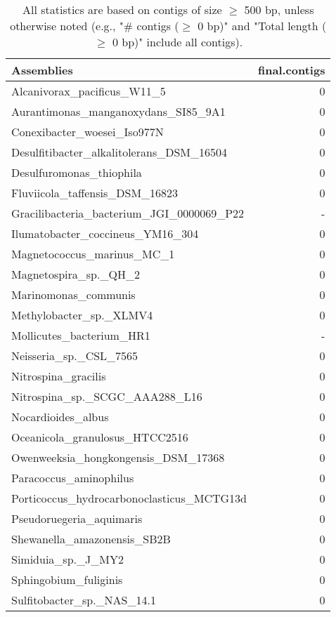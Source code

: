 \documentclass[12pt,a4paper]{article}
\begin{document}
\begin{table}[ht]
\begin{center}
\caption{All statistics are based on contigs of size $\geq$ 500 bp, unless otherwise noted (e.g., "\# contigs ($\geq$ 0 bp)" and "Total length ($\geq$ 0 bp)" include all contigs).}
\begin{tabular}{|l*{1}{|r}|}
\hline
Assemblies & final.contigs \\ \hline
Alcanivorax\_pacificus\_W11\_5 & 0 \\ \hline
Aurantimonas\_manganoxydans\_SI85\_9A1 & 0 \\ \hline
Conexibacter\_woesei\_Iso977N & 0 \\ \hline
Desulfitibacter\_alkalitolerans\_DSM\_16504 & 0 \\ \hline
Desulfuromonas\_thiophila & 0 \\ \hline
Fluviicola\_taffensis\_DSM\_16823 & 0 \\ \hline
Gracilibacteria\_bacterium\_JGI\_0000069\_P22 & - \\ \hline
Ilumatobacter\_coccineus\_YM16\_304 & 0 \\ \hline
Magnetococcus\_marinus\_MC\_1 & 0 \\ \hline
Magnetospira\_sp.\_QH\_2 & 0 \\ \hline
Marinomonas\_communis & 0 \\ \hline
Methylobacter\_sp.\_XLMV4 & 0 \\ \hline
Mollicutes\_bacterium\_HR1 & - \\ \hline
Neisseria\_sp.\_CSL\_7565 & 0 \\ \hline
Nitrospina\_gracilis & 0 \\ \hline
Nitrospina\_sp.\_SCGC\_AAA288\_L16 & 0 \\ \hline
Nocardioides\_albus & 0 \\ \hline
Oceanicola\_granulosus\_HTCC2516 & 0 \\ \hline
Owenweeksia\_hongkongensis\_DSM\_17368 & 0 \\ \hline
Paracoccus\_aminophilus & 0 \\ \hline
Porticoccus\_hydrocarbonoclasticus\_MCTG13d & 0 \\ \hline
Pseudoruegeria\_aquimaris & 0 \\ \hline
Shewanella\_amazonensis\_SB2B & 0 \\ \hline
Simiduia\_sp.\_J\_MY2 & 0 \\ \hline
Sphingobium\_fuliginis & 0 \\ \hline
Sulfitobacter\_sp.\_NAS\_14.1 & 0 \\ \hline

\end{tabular}
\end{center}
\end{table}
\end{document}
